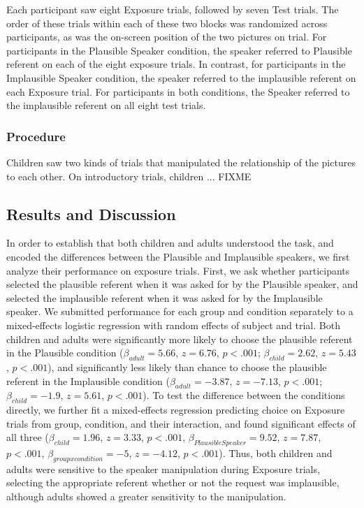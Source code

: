 \documentclass[man,floatsintext]{apa6}
\begin{document}
Each participant saw eight Exposure trials, followed by seven Test trials. The order of these trials within each of these two blocks was randomized across participants, as was the on-screen position of the two pictures on trial. For participants in the Plausible Speaker condition, the speaker referred to Plausible referent on each of the eight exposure trials. In contrast, for participants in the Implausible Speaker condition, the speaker referred to the implausible referent on each Exposure trial. For participants in both conditions, the Speaker referred to the implausible referent on all eight test trials.

\subsubsection{Procedure}

Children saw two kinds of trials that manipulated the relationship of the pictures to each other. On introductory trials, children ... FIXME

\subsection{Results and Discussion}

In order to establish that both children and adults understood the task, and encoded the differences between the Plausible and Implausible speakers, we first analyze their performance on exposure trials. First, we ask whether participants selected the plausible referent when it was asked for by the Plausible speaker, and selected the implausible referent when it was asked for by the Implausible speaker. We submitted performance for each group and condition separately to a mixed-effects logistic regression with random effects of subject and trial. Both children and adults were significantly more likely to choose the plausible referent in the Plausible condition ($\beta_{adult} = 5.66$, $z = 6.76$, $p <.001$; $\beta_{child} = 2.62$, $z = 5.43$, $p <.001$), and significantly less likely than chance to choose the plausible referent in the Implausible condition ($\beta_{adult} = -3.87$, $z = -7.13$, $p <.001$; $\beta_{child} = -1.9$, $z = 5.61$, $p <.001$). To test the difference between the conditions directly, we further fit a mixed-effects regression predicting choice on Exposure trials from group, condition, and their interaction, and found significant effects of all three ($\beta_{child} = 1.96$,  $z = 3.33$, $p <.001$, $\beta_{Plausible Speaker} = 9.52$,  $z = 7.87$, $p <.001$,  $\beta_{group x condition} = -5$,  $z = -4.12$, $p <.001$). Thus, both children and adults were sensitive to the speaker manipulation during Exposure trials, selecting the appropriate referent whether or not the request was implausible, although adults showed a greater sensitivity to the manipulation.
\end{document}
